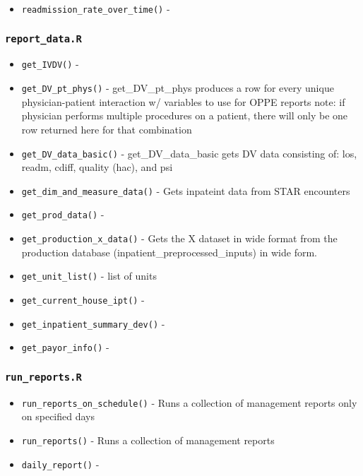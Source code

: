 \documentclass[
]{book}
\providecommand{\tightlist}{%
  \setlength{\itemsep}{0pt}\setlength{\parskip}{0pt}}
\begin{document}
\begin{itemize}
\tightlist
\item
  \texttt{readmission\_rate\_over\_time()} -
\end{itemize}

\hypertarget{report_data.r}{%
\subsubsection{\texorpdfstring{\texttt{report\_data.R}}{report\_data.R}}\label{report_data.r}}

\begin{itemize}
\tightlist
\item
  \texttt{get\_IVDV()} -
\item
  \texttt{get\_DV\_pt\_phys()} - get\_DV\_pt\_phys produces a row for every unique physician-patient interaction w/ variables to use for OPPE reports note: if physician performs multiple procedures on a patient, there will only be one row returned here for that combination
\item
  \texttt{get\_DV\_data\_basic()} - get\_DV\_data\_basic gets DV data consisting of: los, readm, cdiff, quality (hac), and psi
\item
  \texttt{get\_dim\_and\_measure\_data()} - Gets inpateint data from STAR encounters
\item
  \texttt{get\_prod\_data()} -
\item
  \texttt{get\_production\_x\_data()} - Gets the X dataset in wide format from the production database (inpatient\_preprocessed\_inputs) in wide form.
\item
  \texttt{get\_unit\_list()} - list of units
\item
  \texttt{get\_current\_house\_ipt()} -
\item
  \texttt{get\_inpatient\_summary\_dev()} -
\item
  \texttt{get\_payor\_info()} -
\end{itemize}

\hypertarget{run_reports.r}{%
\subsubsection{\texorpdfstring{\texttt{run\_reports.R}}{run\_reports.R}}\label{run_reports.r}}

\begin{itemize}
\tightlist
\item
  \texttt{run\_reports\_on\_schedule()} - Runs a collection of management reports only on specified days
\item
  \texttt{run\_reports()} - Runs a collection of management reports
\item
  \texttt{daily\_report()} -
\end{itemize}
\end{document}
